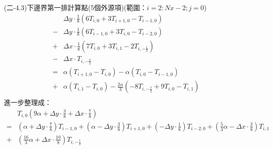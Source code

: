 \documentclass[12pt]{article}
\begin{document}
\noindent (二-4.3)下邊界第一排計算點(5個外源項)(範圍：$i = 2 : Nx-2 ; j = 0$)\\
\begin{equation}
\begin{split}
  &\Delta y \cdot \frac{1}{8}\left(6T_{i,0}+3T_{i+1,0}-T_{i-1,0}\right)  \\
   -&\Delta y \cdot \frac{1}{8}\left(6T_{i-1,0}+3T_{i,0}-T_{i-2,0}\right) \\
   +&\Delta x \cdot \frac{1}{8}\left(7T_{i,0}+3T_{i,1}-2T_{i,-\frac{1}{2}}\right)  \\
   -&\Delta x \cdot T_{i,-\frac{1}{2}}\\
  =& \alpha (T_{i+1,0}-T_{i,0})-  \alpha (T_{i,0}-T_{i-1,0})\\
   +& \alpha (T_{i,1}-T_{i,0}) -  \frac{2\alpha}{3} (-8T_{i,-\frac{1}{2}}+ 9T_{i,0}-T_{i,1})\\
\end{split}
\end{equation}
\noindent 進一步整理成：
\begin{equation}
\begin{split}
 &T_{i,0}(9\alpha + \Delta y \cdot \frac{3}{8}+\Delta x \cdot \frac{7}{8} )\\
 =& (\alpha+\Delta y \cdot \frac{7}{8})T_{i-1,0}+(\alpha-\Delta y \cdot \frac{3}{8})T_{i+1,0}+(-\Delta y \cdot \frac{1}{8})T_{i-2,0}+(\frac{5}{3}\alpha-\Delta x \cdot \frac{3}{8})T_{i,1}\\
 +&(\frac{16}{3}\alpha+\Delta x \cdot \frac{10}{8})T_{i,-\frac{1}{2}}
\end{split}
\end{equation}
\end{document}
